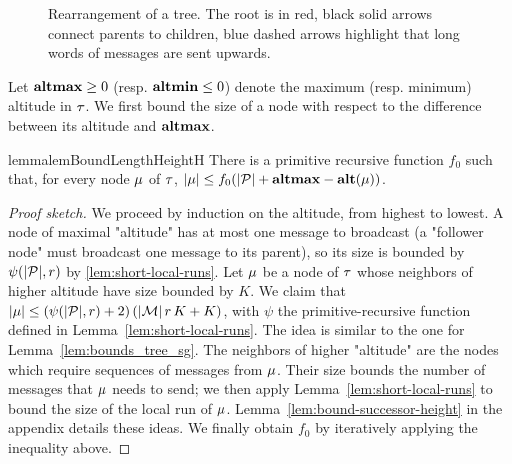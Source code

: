 \begin{figure}[t]
	
	\caption{Rearrangement of a tree. The root is in red, black solid arrows connect parents to children, blue dashed arrows highlight that long words of messages are sent upwards.}
	\label{fig:rearrange-tree}
\end{figure}

Let $\mathbf{altmax} \geq 0$ (resp. $\mathbf{altmin} \leq 0$) denote the maximum (resp. minimum) altitude in $\tau$.
We first bound the size of a node with respect to the difference between its altitude and $\mathbf{altmax}$.

\begin{restatable}{lemma}{lemBoundLengthHeightH}
	\label{lem:bound-length-at-height-h}
	There is a primitive recursive function $f_0$ such that, for every node $\mu$ of $\tau$, $|\mu| \leq f_0(|\mathcal{P}| + \mathbf{altmax} - \mathbf{alt}(\mu))$.
\end{restatable}
\begin{proof}[Proof sketch]
	We proceed by induction on the altitude, from highest to lowest. 
	A node of maximal "altitude"  has at most one message to broadcast (a "follower node" must broadcast one message to its parent), so its size is bounded by $\psi(|\mathcal{P}|,r)$ by \cref{lem:short-local-runs}.
	Let $\mu$ be a node of $\tau$ whose neighbors of higher altitude have size bounded by $K$.
	We claim that $|\mu| \leq (\psi(|\mathcal{P}|, r)+2) \, (|\mathcal{M}| \, r \, K + K)$, with $\psi$ the primitive-recursive function defined in Lemma~\ref{lem:short-local-runs}. 
	The idea is similar to the one for Lemma~\ref{lem:bounds_tree_sg}. The neighbors of higher "altitude" are the nodes which require sequences of messages from $\mu$. Their size bounds the number of messages that $\mu$ needs to send; we then apply Lemma~\ref{lem:short-local-runs} to bound the size of the local run of $\mu$. Lemma~\ref{lem:bound-successor-height} in the appendix details these ideas.
We finally obtain $f_0$ by iteratively applying the inequality above.
\end{proof}



